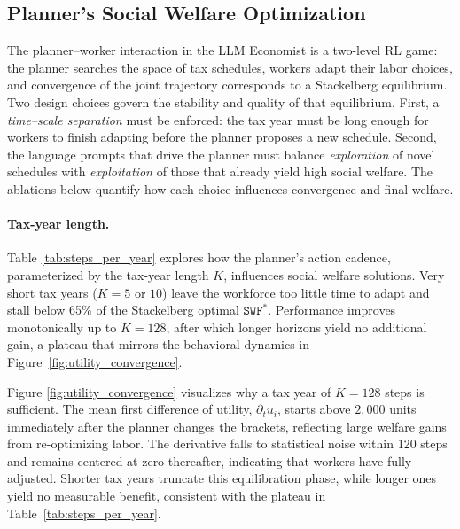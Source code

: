 \subsection{Planner's Social Welfare Optimization}\label{subsub:icrl}  %

The planner–worker interaction in the LLM Economist is a two-level RL game: the planner searches the space of tax schedules, workers adapt their labor choices, and convergence of the joint trajectory corresponds to a Stackelberg equilibrium.  
Two design choices govern the stability and quality of that equilibrium.  
First, a \emph{time–scale separation} must be enforced: the tax year must be long enough for workers to finish adapting before the planner proposes a new schedule.  
Second, the language prompts that drive the planner must balance \emph{exploration} of novel schedules with \emph{exploitation} of those that already yield high social welfare.
The ablations below quantify how each choice influences convergence and final welfare.

\paragraph{Tax-year length.}
Table \ref{tab:steps_per_year} explores how the planner’s action cadence, parameterized by the tax-year length \(K\), influences social welfare solutions.
Very short tax years ($K\!=\!5$ or $10$) leave the workforce too little time to adapt and stall below 65\% of the Stackelberg optimal \(\texttt{SWF}^{*}\).  
Performance improves monotonically up to \(K\!=\!128\), after which longer horizons yield no additional gain, a plateau that mirrors the behavioral dynamics in Figure~\ref{fig:utility_convergence}.

Figure \ref{fig:utility_convergence} visualizes why a tax year of $K=128$ steps is sufficient. 
The mean first difference of utility, $\partial_t u_i$, starts above $2{,}000$ units immediately after the planner changes the brackets, reflecting large welfare gains from re-optimizing labor. 
The derivative falls to statistical noise within 120 steps and remains centered at zero thereafter, indicating that workers have fully adjusted. 
Shorter tax years truncate this equilibration phase, while longer ones yield no measurable benefit, consistent with the plateau in Table~\ref{tab:steps_per_year}.


